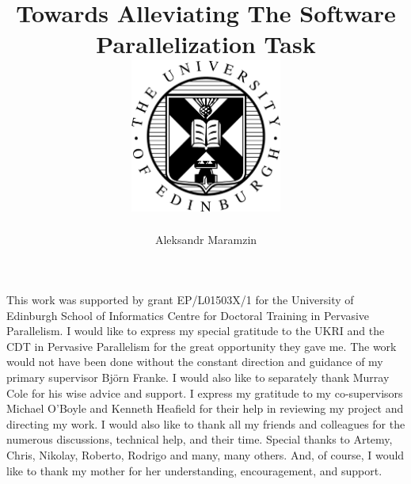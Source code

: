 \documentclass[mphil,icsa]{infthesis}
\title{
{Towards Alleviating The Software Parallelization Task}\\
{\includegraphics[width=50mm,scale=0.5]{eushield-normal.pdf}}
}
\author{Aleksandr Maramzin}
\begin{document}
\begin{preliminary}

\maketitle

\begin{acknowledgements}
\quad This work was supported by grant EP/L01503X/1 for the University of Edinburgh School of Informatics Centre for Doctoral Training in Pervasive Parallelism. I would like to express my special gratitude to the UKRI and the CDT in Pervasive Parallelism for the great opportunity they gave me.\newline\null
\quad The work would not have been done without the constant direction and guidance of my primary supervisor Bj\"{o}rn Franke. I would also like to separately thank Murray Cole for his wise advice and support. I express my gratitude to my co-supervisors Michael O'Boyle and Kenneth Heafield for their help in reviewing my project and directing my work.\newline\null
\quad I would also like to thank all my friends and colleagues for the numerous discussions, technical help, and their time. Special thanks to Artemy, Chris, Nikolay, Roberto, Rodrigo and many, many others. And, of course, I would like to thank my mother for her understanding, encouragement, and support.
\end{acknowledgements}

\standarddeclaration


\tableofcontents


\end{preliminary}



% 




\end{document}
